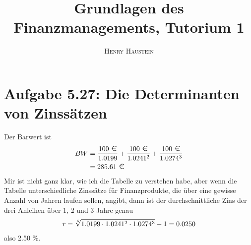 \documentclass{article}
\title{\textbf{Grundlagen des Finanzmanagements, Tutorium 1}}
\author{\textsc{Henry Haustein}}
\date{}
\begin{document}
	\maketitle
	
	\section*{Aufgabe 5.27: Die Determinanten von Zinssätzen}
	Der Barwert ist
	\begin{align}
		BW &= \frac{100 \text{ \EUR}}{1.0199} + \frac{100 \text{ \EUR}}{1.0241^2} + \frac{100\text{ \EUR}}{1.0274^3} \notag \\
		&= 285.61 \text{ \EUR} \notag
	\end{align}
	Mir ist nicht ganz klar, wie ich die Tabelle zu verstehen habe, aber wenn die Tabelle unterschiedliche Zinssätze für Finanzprodukte, die über eine gewisse Anzahl von Jahren laufen sollen, angibt, dann ist der durchschnittliche Zins der drei Anleihen über 1, 2 und 3 Jahre genau
	\begin{align}
		r = \sqrt[6]{1.0199\cdot 1.0241^2\cdot 1.0274^3} -1 = 0.0250 \notag
	\end{align}
	also 2.50 \%.
\end{document}
